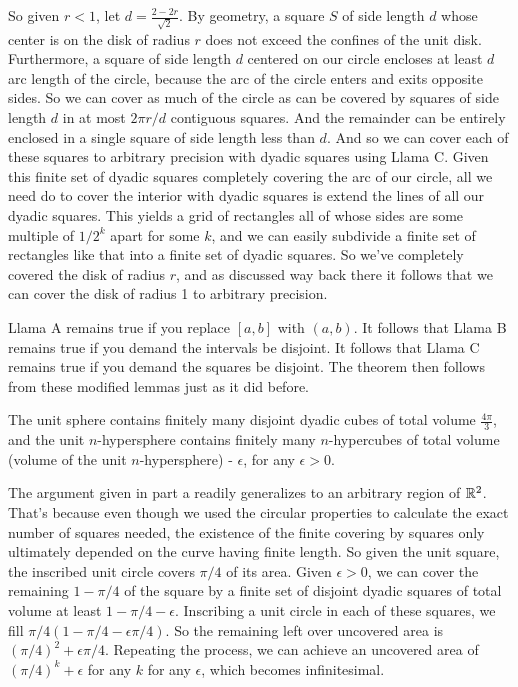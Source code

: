 \documentclass[11pt, oneside]{article}   	%
\begin{document}
So given $r < 1$, let $d = \frac{2 - 2r}{\sqrt{2}}$. By geometry, a square $S$ of side length $d$ whose center is on the disk of radius $r$ does not exceed the confines of the unit disk. Furthermore, a square of side length $d$ centered on our circle encloses at least $d$ arc length of the circle, because the arc of the circle enters and exits opposite sides. So we can cover as much of the circle as can be covered by squares of side length $d$ in at most $2\pi r / d$ contiguous squares. And the remainder can be entirely enclosed in a single square of side length less than $d$. And so we can cover each of these squares to arbitrary precision with dyadic squares using Llama C. Given this finite set of dyadic squares completely covering the arc of our circle, all we need do to cover the interior with dyadic squares is extend the lines of all our dyadic squares. This yields a grid of rectangles all of whose sides are some multiple of $1/2^k$ apart for some $k$, and we can easily subdivide a finite set of rectangles like that into a finite set of dyadic squares. So we've completely covered the disk of radius $r$, and as discussed way back there it follows that we can cover the disk of radius 1 to arbitrary precision.
\item Llama A remains true if you replace $[a, b]$ with $(a, b)$. It follows that Llama B remains true if you demand the intervals be disjoint. It follows that Llama C remains true if you demand the squares be disjoint. The theorem then follows from these modified lemmas just as it did before.
\item The unit sphere contains finitely many disjoint dyadic cubes of total volume $\frac{4\pi}{3}$, and the unit $n$-hypersphere contains finitely many $n$-hypercubes of total volume (volume of the unit $n$-hypersphere) - $\epsilon$, for any $\epsilon > 0$. 
\item The argument given in part a readily generalizes to an arbitrary region of $\mathbb{R}^2$. That's because even though we used the circular properties to calculate the exact number of squares needed, the existence of the finite covering by squares only ultimately depended on the curve having finite length. So given the unit square, the inscribed unit circle covers $\pi/4$ of its area. Given $\epsilon > 0$, we can cover the remaining $1-\pi/4$ of the square by a finite set of disjoint dyadic squares of total volume at least $1 - \pi / 4 - \epsilon$. Inscribing a unit circle in each of these squares, we fill $\pi/4(1 - \pi / 4 - \epsilon \pi / 4)$. So the remaining left over uncovered area is $(\pi/4)^2 + \epsilon\pi/4$. Repeating the process, we can achieve an uncovered area of $(\pi/4)^k + \epsilon$ for any $k$ for any $\epsilon$, which becomes infinitesimal. 
\end{document}
